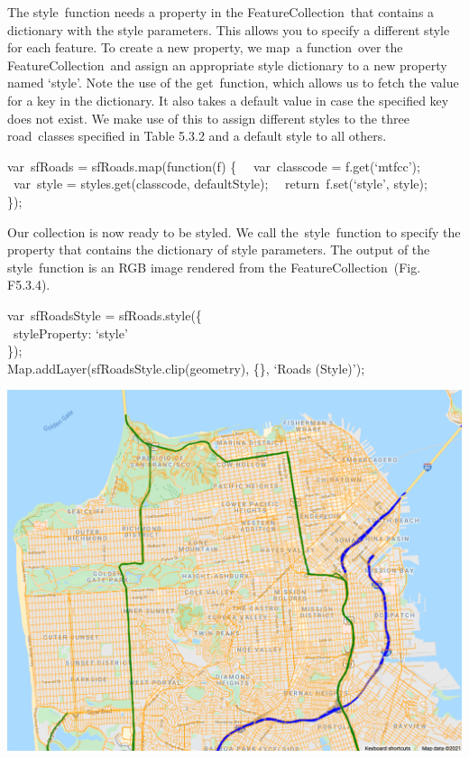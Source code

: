 \documentclass[
  letterpaper,
  DIV=11,
  numbers=noendperiod]{scrreprt}
\begin{document}
The style~function needs a property in the FeatureCollection~that
contains a dictionary with the style parameters. This allows you to
specify a different style for each feature. To create a new property, we
map~a function~over the FeatureCollection~and assign an appropriate
style dictionary to a new property named `style'. Note the use of the
get~function, which allows us to fetch the value for a key in the
dictionary. It also takes a default value in case the specified key does
not exist. We make use of this to assign different styles to the three
road~classes specified in Table 5.3.2 and a default style to all others.

var~sfRoads = sfRoads.map(function(f) \{~ ~var~classcode =
f.get(`mtfcc');~ ~var~style = styles.get(classcode, defaultStyle);~
~return~f.set(`style', style);\\
\});

Our collection is now ready to be styled. We call the~style~function to
specify the property that contains the dictionary of style parameters.
The output of the style~function is an RGB image rendered from the
FeatureCollection~(Fig. F5.3.4).

var~sfRoadsStyle = sfRoads.style(\{\\
\hspace*{0.333em} ~styleProperty: `style'\\
\});\\
Map.addLayer(sfRoadsStyle.clip(geometry), \{\}, `Roads (Style)');

\includegraphics{./F5/image46.png}
\end{document}
